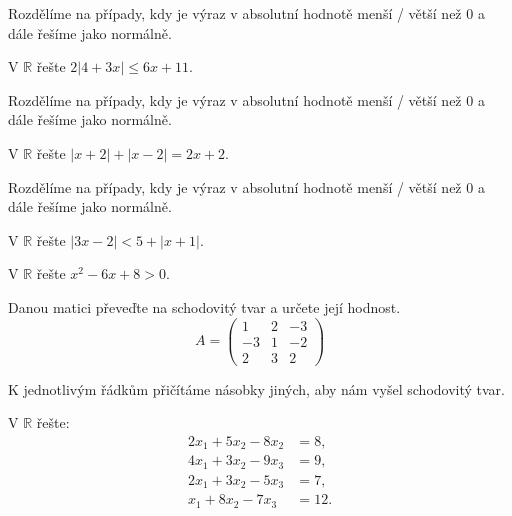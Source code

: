 \begin{reseni}
Rozdělíme na případy, kdy je výraz v absolutní hodnotě menší / větší než 0
a dále řešíme jako normálně.
\end{reseni}

\begin{priklad}
V $\mathbb R$ řešte $2|4+3x|\leq 6x+11.$
\end{priklad}

\begin{reseni}
Rozdělíme na případy, kdy je výraz v absolutní hodnotě menší / větší než 0
a dále řešíme jako normálně.
\end{reseni}

\begin{priklad}
V $\mathbb R$ řešte $|x+2|+|x-2|=2x+2.$
\end{priklad}

\begin{reseni}
Rozdělíme na případy, kdy je výraz v absolutní hodnotě menší / větší než 0
a dále řešíme jako normálně.
\end{reseni}

\begin{priklad}
V $\mathbb R$ řešte $|3x-2|<5+|x+1|.$
\end{priklad}

\begin{priklad}
V $\mathbb R$ řešte $x^2-6x+8 >0.$
\end{priklad}

\begin{priklad}
Danou matici převeďte na schodovitý tvar a určete její hodnost.
$$A=\begin{pmatrix}
    1 & 2 & -3 \\
    -3 & 1 & -2 \\
    2 & 3 & 2
\end{pmatrix}$$
\end{priklad}

\begin{reseni}
K jednotlivým řádkům přičítáme násobky jiných, aby nám vyšel schodovitý tvar.
\end{reseni}

\begin{priklad}
V $\mathbb R$ řešte:
\begin{align*}
    2x_1+5x_2-8x_2 & =8, \\
    4x_1 + 3x_2 - 9x_3 & =9,\\
    2x_1 + 3x_2 - 5x_3 & = 7, \\
    x_1 + 8x_2 - 7x_3 & = 12.
\end{align*}
\end{priklad}

